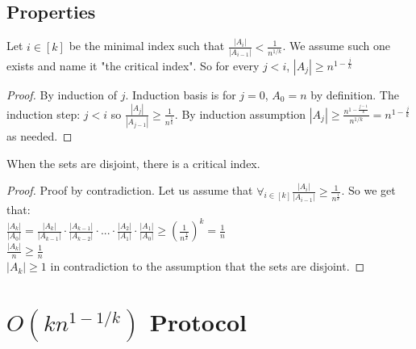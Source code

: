 \documentclass{article}
\begin{document}
\subsection{Properties}
\begin{claim}
Let $i \in [k]$ be the minimal index such that $\frac{|A_{i}|}{|A_{i-1}|} < \frac{1}{n^{1/k}}$. We assume such one exists and name it "the critical index". So for every $j < i$, $|A_j| \geq n^{1-\frac{j}{k}}$
\end{claim}
\begin{proof}
By induction of $j$. Induction basis is for $j = 0$, $A_0 = n$ by definition. The induction step: $j < i$ so $\frac{|A_{j}|}{|A_{j-1}|} \geq \frac{1}{n^{\frac{1}{k}}}$. By induction assumption $|A_{j}| \geq \frac{n^{1-\frac{j-1}{k}}}{n^{1/k}} = n^{1-\frac{j}{k}}$ as needed.
\end{proof}
\begin{claim}
When the sets are disjoint, there is a critical index.
\end{claim}
\begin{proof}
Proof by contradiction.
Let us assume that $\forall_{i\in[k]} \frac{|A_i|}{|A_{i-1}|} \geq \frac{1}{n^{\frac{1}{k}}}$. So we get that: \\
 $\frac{|A_k|}{|A_0|} = \frac{|A_k|}{|A_{k-1}|}\cdot\frac{|A_{k-1}|}{|A_{k-2}|}\cdot...\cdot\frac{|A_2|}{|A_1|}\cdot\frac{|A_1|}{|A_0|} \geq \left (  \frac{1}{n^{\frac{1}{k}}} \right )^k = \frac{1}{n} $ \\
 $ \frac{|A_k|}{n} \geq \frac{1}{n}$ \\
 $ |A_k| \geq 1$ in contradiction to the assumption that the sets are disjoint.
\end{proof}
\section{$O(kn^{1-1/k})$ Protocol}
\end{document}
